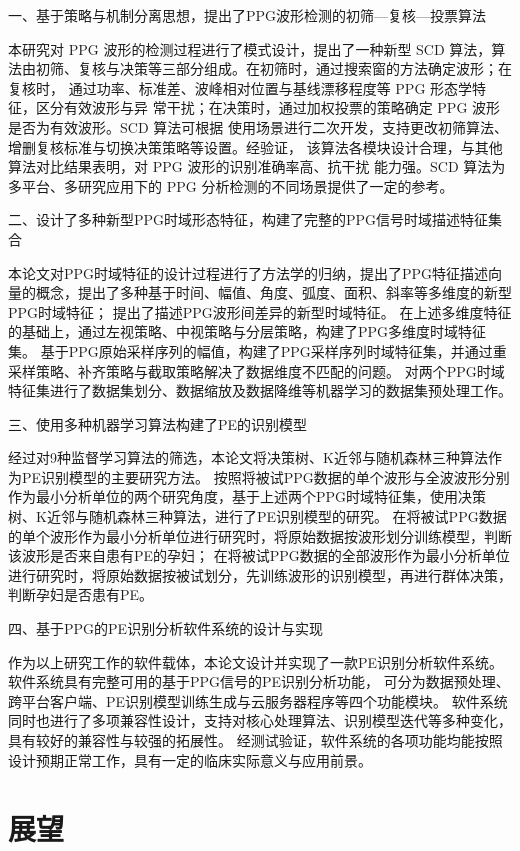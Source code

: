 一、基于策略与机制分离思想，提出了PPG波形检测的初筛—复核—投票算法

本研究对 PPG 波形的检测过程进行了模式设计，提出了一种新型 SCD 算法，算
法由初筛、复核与决策等三部分组成。在初筛时，通过搜索窗的方法确定波形；在复核时，
通过功率、标准差、波峰相对位置与基线漂移程度等 PPG 形态学特征，区分有效波形与异
常干扰；在决策时，通过加权投票的策略确定 PPG 波形是否为有效波形。SCD 算法可根据
使用场景进行二次开发，支持更改初筛算法、增删复核标准与切换决策策略等设置。经验证，
该算法各模块设计合理，与其他算法对比结果表明，对 PPG 波形的识别准确率高、抗干扰
能力强。SCD 算法为多平台、多研究应用下的 PPG 分析检测的不同场景提供了一定的参考。

二、设计了多种新型PPG时域形态特征，构建了完整的PPG信号时域描述特征集合

本论文对PPG时域特征的设计过程进行了方法学的归纳，提出了PPG特征描述向量的概念，提出了多种基于时间、幅值、角度、弧度、面积、斜率等多维度的新型PPG时域特征；
提出了描述PPG波形间差异的新型时域特征。
在上述多维度特征的基础上，通过左视策略、中视策略与分层策略，构建了PPG多维度时域特征集。
基于PPG原始采样序列的幅值，构建了PPG采样序列时域特征集，并通过重采样策略、补齐策略与截取策略解决了数据维度不匹配的问题。
对两个PPG时域特征集进行了数据集划分、数据缩放及数据降维等机器学习的数据集预处理工作。


三、使用多种机器学习算法构建了PE的识别模型

经过对9种监督学习算法的筛选，本论文将决策树、K近邻与随机森林三种算法作为PE识别模型的主要研究方法。
按照将被试PPG数据的单个波形与全波波形分别作为最小分析单位的两个研究角度，基于上述两个PPG时域特征集，使用决策树、K近邻与随机森林三种算法，进行了PE识别模型的研究。
在将被试PPG数据的单个波形作为最小分析单位进行研究时，将原始数据按波形划分训练模型，判断该波形是否来自患有PE的孕妇；
在将被试PPG数据的全部波形作为最小分析单位进行研究时，将原始数据按被试划分，先训练波形的识别模型，再进行群体决策，判断孕妇是否患有PE。

四、基于PPG的PE识别分析软件系统的设计与实现

作为以上研究工作的软件载体，本论文设计并实现了一款PE识别分析软件系统。软件系统具有完整可用的基于PPG信号的PE识别分析功能，
可分为数据预处理、跨平台客户端、PE识别模型训练生成与云服务器程序等四个功能模块。
软件系统同时也进行了多项兼容性设计，支持对核心处理算法、识别模型迭代等多种变化，具有较好的兼容性与较强的拓展性。
经测试验证，软件系统的各项功能均能按照设计预期正常工作，具有一定的临床实际意义与应用前景。

\section{展望}

